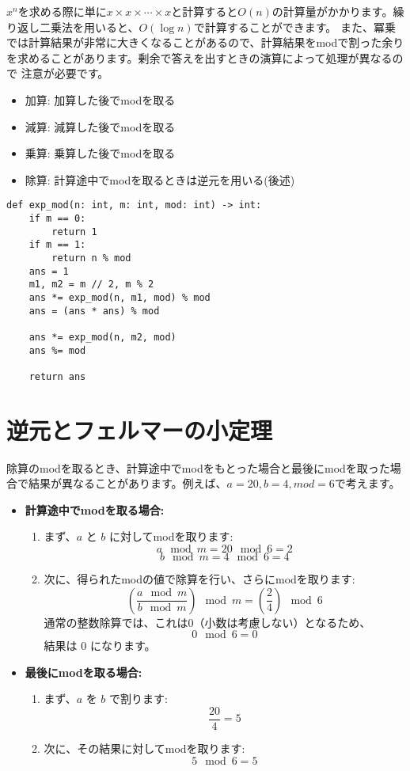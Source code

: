 $x^n$を求める際に単に$x \times x \times \cdots \times x$と計算すると$O(n)$の計算量がかかります。繰り返し二乗法を用いると、$O(\log n)$で計算することができます。
また、冪乗では計算結果が非常に大きくなることがあるので、計算結果をmodで割った余りを求めることがあります。剰余で答えを出すときの演算によって処理が異なるので
注意が必要です。

\begin{itemize}
    \item 加算: 加算した後でmodを取る
    \item 減算: 減算した後でmodを取る
    \item 乗算: 乗算した後でmodを取る
    \item 除算: 計算途中でmodを取るときは逆元を用いる(後述)
\end{itemize}

\begin{lstlisting}[caption=繰り返し二乗法の実装, label=power, frame=TRBL]
def exp_mod(n: int, m: int, mod: int) -> int:
    if m == 0:
        return 1
    if m == 1:
        return n % mod
    ans = 1
    m1, m2 = m // 2, m % 2
    ans *= exp_mod(n, m1, mod) % mod
    ans = (ans * ans) % mod
    
    ans *= exp_mod(n, m2, mod)
    ans %= mod
    
    return ans
\end{lstlisting}

\section{逆元とフェルマーの小定理}

除算のmodを取るとき、計算途中でmodをもとった場合と最後にmodを取った場合で結果が異なることがあります。例えば、$a = 20, b = 4, mod = 6$で考えます。

\begin{itemize}
    \item \textbf{計算途中でmodを取る場合:}
    \begin{enumerate}
        \item まず、\( a \) と \( b \) に対してmodを取ります:
        \[
        a \mod m = 20 \mod 6 = 2
        \]
        \[
        b \mod m = 4 \mod 6 = 4
        \]
        \item 次に、得られたmodの値で除算を行い、さらにmodを取ります:
        \[
        \left(\frac{a \mod m}{b \mod m}\right) \mod m = \left(\frac{2}{4}\right) \mod 6
        \]
        通常の整数除算では、これは0（小数は考慮しない）となるため、
        \[
        0 \mod 6 = 0
        \]
        結果は \( 0 \) になります。
    \end{enumerate}

    \item \textbf{最後にmodを取る場合:}
    \begin{enumerate}
        \item まず、\( a \) を \( b \) で割ります:
        \[
        \frac{20}{4} = 5
        \]
        \item 次に、その結果に対してmodを取ります:
        \[
        5 \mod 6 = 5
        \]
    \end{enumerate}
\end{itemize}


